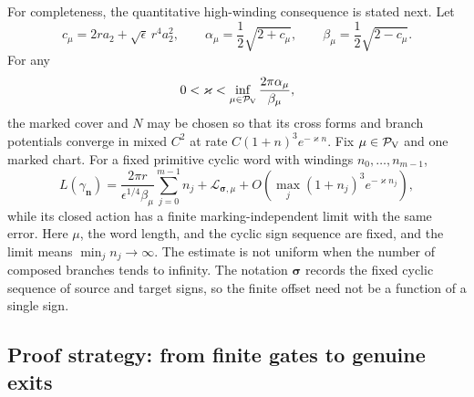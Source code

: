 \documentclass[11pt,reqno]{amsart}
\numberwithin{equation}{section}
\theoremstyle{definition}
\theoremstyle{remark}
\newcommand{\cP}{\mathcal P}
\begin{document}
For completeness, the quantitative high-winding consequence is stated next.
Let
\begin{equation}\label{eq:alpha-beta}
 c_\mu=2ra_2+\sqrt\epsilon\,r^4a_2^2,\qquad
 \alpha_\mu=\frac12\sqrt{2+c_\mu},\qquad
 \beta_\mu=\frac12\sqrt{2-c_\mu}.
\end{equation}
For any
\begin{equation}\label{eq:kappa}
 0<\varkappa<\inf_{\mu\in\cP_{\rm V}}
                  \frac{2\pi\alpha_\mu}{\beta_\mu},
\end{equation}
the marked cover and $N$ may be chosen so that its cross forms and branch
potentials converge in mixed $C^2$ at rate
$C(1+n)^3e^{-\varkappa n}$.  Fix $\mu\in\cP_{\rm V}$ and one marked chart.
For a fixed primitive cyclic word with windings $n_0,\ldots,n_{m-1}$,
\begin{equation}\label{eq:period-asymptotic}
 L(\gamma_{\mathbf n})
 =\frac{2\pi r}{\epsilon^{1/4}\beta_\mu}
    \sum_{j=0}^{m-1}n_j
  +\mathcal L_{\boldsymbol\sigma,\mu}
  +O\!\left(\max_j(1+n_j)^3e^{-\varkappa n_j}\right),
\end{equation}
while its closed action has a finite marking-independent limit with the same
error.  Here $\mu$, the word length, and the cyclic sign sequence are fixed,
and the limit means $\min_j n_j\to\infty$.  The estimate is not uniform when
the number of composed branches tends to infinity.  The notation
$\boldsymbol\sigma$ records the fixed cyclic sequence of source and target
signs, so the finite offset need not be a function of a single sign.

\subsection{Proof strategy: from finite gates to genuine exits}
\end{document}
